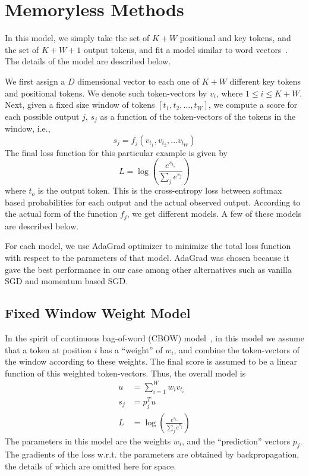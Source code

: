 \vspace{-10pt}
\section{Memoryless Methods}
\label{sec:memoryless}

\noindent
In this model, we simply take the set of $K+W$ positional and key tokens, and
the set of $K+W+1$ output tokens, and fit a model similar to word
vectors~\cite{ref:mikolov:wvec}. The details of the model are described below.

We first assign a $D$ dimensional vector to each one of $K+W$ different key
tokens and positional tokens. We denote such token-vectors by $v_i$, where $1
\leq i \leq K+W$. Next, given a fixed size window of tokens $[t_1, t_2, \ldots,
t_W]$, we compute a score for each possible output $j$, $s_j$ as a function of
the token-vectors of the tokens in the window, i.e.,
\[
s_j = f_j\left(v_{t_1}, v_{t_2}, \ldots v_{t_W}\right)
\]
The final loss function for this particular example is given by 
\[
L = \log\left(\frac{e^{s_{t_o}}}{\sum_j{e^{s_j}}}\right)
\]
where $t_o$ is the output token. This is the cross-entropy loss
between softmax based probabilities for each output and the actual observed
output. According to the actual form of the function $f_j$, we get different
models. A few of these models are described below.

For each model, we use {\sc AdaGrad} optimizer to minimize the total loss
function with respect to the parameters of that model. {\sc AdaGrad} was chosen
because it gave the best performance in our case among other alternatives such
as vanilla SGD and momentum based SGD.

\subsection{Fixed Window Weight Model}
In the spirit of continuous bag-of-word (CBOW) model~\cite{ref:mikolov:wvec}, in
this model we assume that a token at position $i$ has a ``weight'' of $w_i$, and
combine the token-vectors of the window according to these weights. The final
score is assumed to be a linear function of this weighted token-vectors. Thus,
the overall model is
\begin{align}
u &= \sum_{i=1}^{W}{w_i v_{t_i}}\\
s_j &= p_j^Tu\\
L &= \log\left(\frac{e^{s_{t_o}}}{\sum_j{e^{s_j}}}\right)
\end{align}
The parameters in this model are the weights $w_i$, and the ``prediction''
vectors $p_j$. The gradients of the loss w.r.t. the parameters are obtained by
backpropagation, the details of which are omitted here for space.

